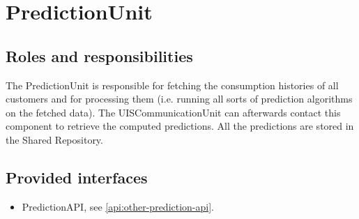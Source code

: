 \section{PredictionUnit}
\label{element:prediction-unit}

\subsection{Roles and responsibilities}

\npar The PredictionUnit is responsible for fetching the consumption
histories of all customers and for processing them (i.e. running all sorts of
prediction algorithms on the fetched data). The UISCommunicationUnit can
afterwards contact this component to retrieve the computed predictions. All the
predictions are stored in the Shared Repository.

\subsection{Provided interfaces}

\begin{itemize}
  \item PredictionAPI, see \ref{api:other-prediction-api}.
\end{itemize}